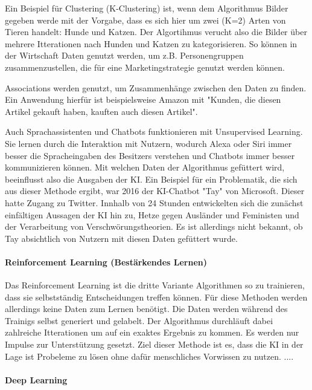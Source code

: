 \documentclass[a4paper,12pt, german]{report}
\begin{document}
Ein Beispiel für Clustering (K-Clustering) ist, wenn dem Algorithmus Bilder gegeben werde mit der Vorgabe, dass es sich hier um zwei (K=2) Arten von Tieren handelt: Hunde und Katzen. Der Algortihmus verucht also die Bilder über mehrere Itterationen nach Hunden und Katzen zu kategorisieren. So können in der Wirtschaft Daten genutzt werden, um z.B. Personengruppen zusammenzustellen, die für eine Marketingstrategie genutzt werden können.

Associations werden genutzt, um Zusammenhänge zwischen den Daten zu finden. Ein Anwendung hierfür ist beispielsweise Amazon mit "Kunden, die diesen Artikel gekauft haben, kauften auch diesen Artikel".

Auch Sprachassistenten und Chatbots funktionieren mit Unsupervised Learning. Sie lernen durch die Interaktion mit Nutzern, wodurch Alexa oder Siri immer besser die Spracheingaben des Besitzers verstehen und Chatbots immer besser kommunizieren können. Mit welchen Daten der Algorithmus gefüttert wird, beeinflusst also die Ausgaben der KI. Ein Beispiel für ein Problematik, die sich aus dieser Methode ergibt, war 2016 der KI-Chatbot "Tay" von Microsoft. Dieser hatte Zugang zu Twitter. Innhalb von 24 Stunden entwickelten sich die zunächst einfältigen Aussagen der KI hin zu, Hetze gegen Ausländer und Feministen und der Verarbeitung von Verschwörungstheorien. Es ist allerdings nicht bekannt, ob Tay absichtlich von Nutzern mit diesen Daten gefüttert wurde. 




\paragraph{Reinforcement Learning (Bestärkendes Lernen)} $ $ \\ Das Reinforcement Learning ist die dritte Variante Algorithmen so zu trainieren, dass sie selbstständig Entscheidungen treffen können. Für diese Methoden werden allerdings keine Daten zum Lernen benötigt. Die Daten werden während des Trainigs selbst generiert und gelabelt. Der Algorithmus durchläuft dabei zahlreiche Itterationen um auf ein exaktes Ergebnis zu kommen. Es werden nur Impulse zur Unterstützung gesetzt. Ziel dieser Methode ist es, dass die KI in der Lage ist Probeleme zu lösen ohne dafür menschliches Vorwissen zu nutzen.
....




\paragraph{Deep Learning}
\end{document}
